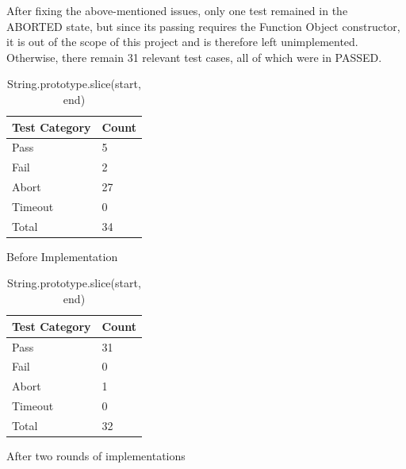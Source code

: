 \documentclass[a4paper,11pt,twoside]{report}
\begin{document}
\begin{itemize}
After fixing the above-mentioned issues, only one test remained in the ABORTED state, but since its passing requires the Function Object constructor, it is out of the scope of this project and is therefore left unimplemented. Otherwise, there remain 31 relevant test cases, all of which were in PASSED.
\begin{table}[ht!]
\centering
\begin{subtable}{0.5\textwidth}
\centering
\begin{tabular}{|p{3cm}|p{2cm}|} \hline
\textbf{Test Category} & \textbf{Count} \\ \hline
Pass & 5 \\
Fail & 2 \\
Abort & 27 \\
Timeout & 0 \\
Total & 34 \\ \hline
\end{tabular}
\caption{Before Implementation}
\end{subtable}%
\begin{subtable}{0.5\textwidth}
\centering
\begin{tabular}{|p{3cm}|p{2cm}|} \hline
\textbf{Test Category} & \textbf{Count} \\ \hline
Pass & 31 \\
Fail & 0 \\
Abort & 1 \\
Timeout & 0 \\
Total & 32 \\ \hline
\end{tabular}
\caption{After two rounds of implementations}
\end{subtable}
\caption{String.prototype.slice(start, end)}
\end{table}


\end{itemize}
\end{document}
